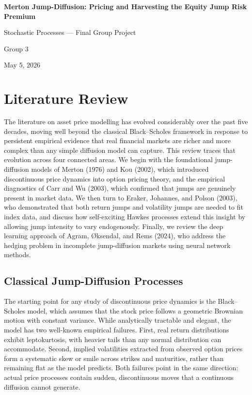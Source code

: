\documentclass[12pt]{article}
\begin{document}
\begin{titlepage}
    \centering
    \vspace*{3cm}
    {\Huge \textbf{Merton Jump-Diffusion: Pricing and Harvesting the Equity Jump Risk Premium} \par}
    \vspace{1.5cm}
    {\large Stochastic Processes --- Final Group Project \par}
    \vspace{2cm}
    {\Large Group 3 \par}
    \vspace{1cm}
    {\large May 5, 2026 \par}
    \vfill
\end{titlepage}

\section*{Literature Review}

The literature on asset price modelling has evolved considerably over the past five decades, moving well beyond the classical Black--Scholes framework in response to persistent empirical evidence that real financial markets are richer and more complex than any simple diffusion model can capture. This review traces that evolution across four connected areas. We begin with the foundational jump-diffusion models of Merton (1976) and Kou (2002), which introduced discontinuous price dynamics into option pricing theory, and the empirical diagnostics of Carr and Wu (2003), which confirmed that jumps are genuinely present in market data. We then turn to Eraker, Johannes, and Polson (2003), who demonstrated that both return jumps and volatility jumps are needed to fit index data, and discuss how self-exciting Hawkes processes extend this insight by allowing jump intensity to vary endogenously. Finally, we review the deep learning approach of Agram, \O{}ksendal, and Rems (2024), who address the hedging problem in incomplete jump-diffusion markets using neural network methods.

\subsection*{Classical Jump-Diffusion Processes}

The starting point for any study of discontinuous price dynamics is the Black--Scholes model, which assumes that the stock price follows a geometric Brownian motion with constant variance. While analytically tractable and elegant, the model has two well-known empirical failures. First, real return distributions exhibit leptokurtosis, with heavier tails than any normal distribution can accommodate. Second, implied volatilities extracted from observed option prices form a systematic skew or smile across strikes and maturities, rather than remaining flat as the model predicts. Both failures point in the same direction: actual price processes contain sudden, discontinuous moves that a continuous diffusion cannot generate.
\end{document}
